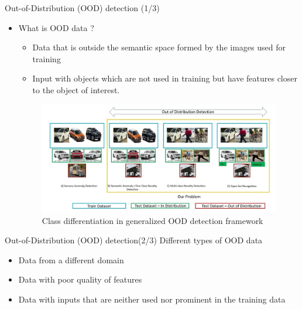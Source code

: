 \documentclass[10pt, aspectratio=169]{beamer}
\begin{document}
\begin{frame}{Out-of-Distribution (OOD) detection (1/3)}
    \begin{itemize}
        \item What is OOD data ?
        \begin{itemize}
            \item Data that is outside the semantic space formed by the images used for training
            \item Input with objects which are not used in training but have features closer to the object of
            interest.
        \end{itemize}
        
        \begin{figure}
            \centering
            \includegraphics[scale=0.215]{images/OOD_vs_Non-OOD.jpg}
            \caption[\acrlong{ood} detection problem setting]{Class differentiation in generalized OOD detection framework}
            \label{fig:OOD_classes}
        \end{figure}
    \end{itemize}
\end{frame}

\begin{frame}{Out-of-Distribution (OOD) detection(2/3)}
    Different types of OOD data
    \begin{itemize}
        \item Data from a different domain
        \item Data with poor quality of features
        \item Data with inputs that are neither used nor prominent in the training data
    \end{itemize}
\end{frame}
\end{document}
